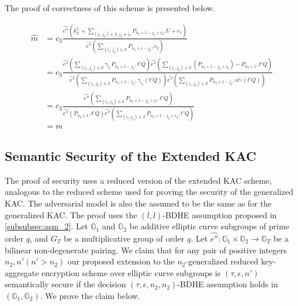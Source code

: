 The proof of correctness of this scheme is presented below.

\begin{scriptsize}
\begin{equation*}
\begin{split}
 \hat{m} &= c_3\frac{\hat{e''}(k^{i_1}_{\mathcal{S}}+\sum_{(i_1,j_2)\in\mathcal{S},j_2\neq i_2}P_{n_2+1-j_2+i_2},U+c_1)}{\hat{e''}(\sum_{(i_1,j_2)\in\mathcal{S}}P_{n_2+1-j_2},c_2)}\\
  &= c_3\frac{\hat{e''}(\sum_{(i_1,j_2)\in \mathcal{S}}{\gamma_{i_1}}P_{n_2+1-j_2},t'Q)\hat{e''}(\sum_{(i_1,j_2)\in\mathcal{S}}(P_{n_2+1-j_2+i_2})-P_{n_2+1},t'Q)}{\hat{e''}(\sum_{(i_1,j_2)\in\mathcal{S}}P_{n_2+1-j_2},\gamma_{i_1}(t'Q))\hat{e''}(\sum_{(i_1,j_2)\in\mathcal{S}}P_{n_2+1-j_2},\alpha^{i_2}(t'Q))}\\
  &= c_3\frac{\hat{e''}(\sum_{(i_1,j_2)\in\mathcal{S}}P_{n_2+1-j_2+i_2},t'Q)}{\hat{e''}(P_{n_2+1},t'Q)\hat{e''}(\sum_{(i_1,j_2)\in\mathcal{S}}P_{n_2+1-j_2+i_2},t'Q)}\\
  &= m
\end{split}  
\end{equation*}
\end{scriptsize}


\subsection{Semantic Security of the Extended KAC}
\label{subsec:proof_extended}

The proof of security uses a reduced version of the extended KAC scheme, analogous to the reduced scheme used for proving the security of the generalized KAC. The adversarial model is also the assumed to be the same as for the generalized KAC. The proof uses the $(l,l)$-BDHE assumption proposed in \ref{subsubsec:asm_2}. Let $\mathbb{G}_1$ and $\mathbb{G}_2$ be additive elliptic curve subgroups of prime order $q$, and $G_T$ be a multiplicative group of order $q$. Let $\hat{e''}:\mathbb{G}_1 \times \mathbb{G}_2\longrightarrow\mathbb{G}_T$ be a bilinear non-degenerate pairing. We claim that for any pair of positive integers $n_2,n' (n'>n_2)$ our proposed extension to the $n_2$-generalized reduced key-aggregate encryption scheme over elliptic curve subgroups is $(\tau,\epsilon,n')$ semantically secure if the decision $(\tau,\epsilon,n_2,n_2)$-BDHE assumption holds in $(\mathbb{G}_1,\mathbb{G}_2)$. We prove the claim below.

